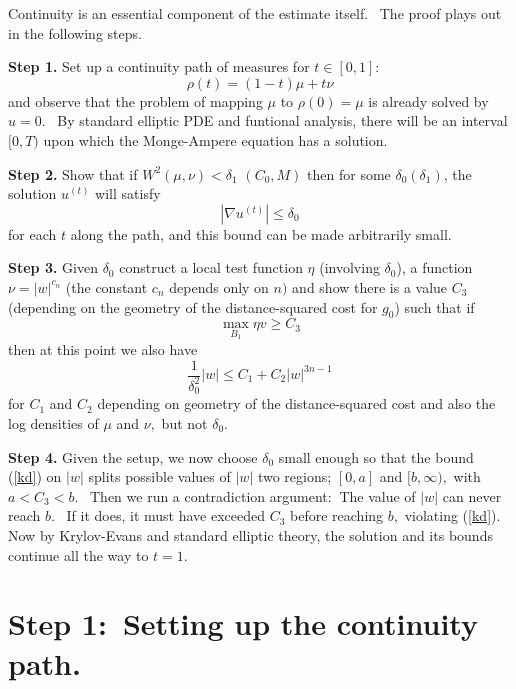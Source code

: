 \documentclass[11pt,letterpaper]{amsart}%
\numberwithin{equation}{section}
\begin{document}
Continuity is an essential component of the estimate itself. \ The proof plays out in
the following steps. \ \ 

\textbf{Step 1.} Set up a continuity path of measures for $ t\in [0,1]$:%
\[
\rho(t)=(1-t)\mu+t\nu
\]
and observe that the problem of mapping $\mu$ to $\rho(0)=\mu$ is already
solved by $u=0.$ \ By standard elliptic PDE and funtional analysis, there will
be an interval $[0,T)$ upon which the Monge-Ampere equation has a solution.

\textbf{Step 2.} Show that if $W^{2}(\mu,\nu)<\delta_{1}$ $\left(
C_{0},M\right)  $ then for some $\delta_{0}(\delta_{1})$, the solution
$u^{(t)}$ will satisfy
\[
\left\vert \nabla u^{(t)}\right\vert \leq\delta_{0}%
\]
for each $t$ along the path, and this bound can be made arbitrarily small. \ 

\textbf{Step 3.} Given $\delta_{0}$ construct a local test function $\eta$
(involving $\delta_{0}$), a function $\nu=\left\vert w\right\vert ^{c_{n}}$
(the constant $c_{n}$ depends only on $n)$ and show there is a value $C_{3}$
(depending on the geometry of the distance-squared cost for $g_{0}$) such
that if
\begin{equation}
\max_{B_{1}}\eta v\geq C_{3} \label{mc3}%
\end{equation}
then at this point we also have
\begin{equation}
\frac{1}{\delta_{0}^{2}}\left\vert w\right\vert \leq C_{1}+C_{2}\left\vert
w\right\vert ^{3n-1} \label{kd}%
\end{equation}
for $C_{1}$ and $C_{2}$ depending on geometry of the distance-squared cost and
also the log densities of $\mu$ and $\nu,$ but not $\delta_0$. 

\textbf{Step 4.} Given the setup, we now choose $\delta_{0}$ small enough so
that the bound (\ref{kd}) on $\left\vert w\right\vert $ splits possible values
of $\left\vert w\right\vert $ two regions; $[0,a]$ and $[b,\infty),$ with
$a<C_{3}<b.$ \ Then we run a contradiction argument: $\ $The value of
$\left\vert w\right\vert $ can never reach $b.$ \ If it does, it must have
exceeded $C_{3}$ before reaching $b,$ violating (\ref{kd}).
Now by Krylov-Evans and standard elliptic theory, the solution and its bounds continue all the way to $t=1$.  

\section{Step 1:\ Setting up the continuity path.}
\end{document}

